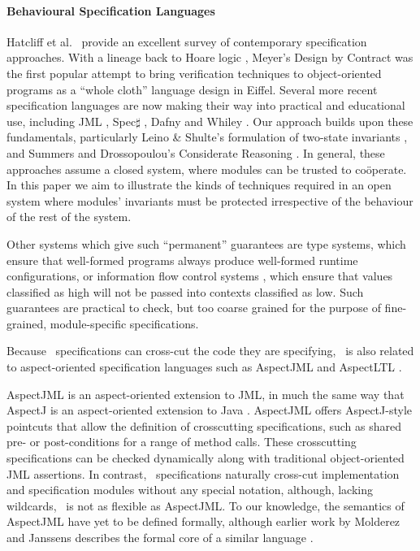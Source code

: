 \paragraph{Behavioural Specification Languages} 

Hatcliff et al.\ \cite{behavSurvey2012} provide an excellent survey of
contemporary specification approaches.  With a lineage back to Hoare
logic \cite{Hoare69}, Meyer's Design by Contract \cite{Mey88} was the
first popular attempt to bring verification techniques to
object-oriented programs as a ``whole cloth'' language design in
Eiffel.  Several more recent specification languages are now making
their way into practical and educational use, including JML
\cite{Leavens-etal07}, Spec$\sharp$ \cite{BarLeiSch05}, Dafny
\cite{dafny} and Whiley \cite{whiley15}. Our approach builds upon
these fundamentals, particularly Leino \& Shulte's
formulation of
two-state invariants \cite{usingHistory}, and Summers and
Drossopoulou's Considerate Reasoning \cite{Considerate}.
%
In general, these approaches assume a closed system, where modules
can be trusted to co{\"o}perate. In this paper we aim to illustrate
the kinds of techniques required in an open system where modules'
invariants must be protected irrespective of the behaviour of the rest
of the system.

 
Other systems which give such ``permanent'' guarantees are  type systems, 
which ensure that well-formed programs  always produce well-formed runtime
configurations, or information flow control systems \cite{infoflow}, which ensure that values 
classified as high  will not be passed into contexts classified as low. 
Such  guarantees %
 are  practical to check, but   too coarse grained
for the purpose of fine-grained,  module-specific specifications. 


Because \Chainmail\ specifications can cross-cut the code they are
specifying, \Chainmail\  is also related to 
aspect-oriented specification
languages such as AspectJML \cite{AspectJML} and AspectLTL
\cite{AspectLTL}.

AspectJML is an aspect-oriented extension to JML,
in much the same way that AspectJ is an aspect-oriented extension to
Java \cite{AspectJ}.  AspectJML offers AspectJ-style pointcuts 
that allow the definition of crosscutting specifications, such as 
shared pre- or post-conditions for a range of method calls. These
crosscutting specifications can be checked dynamically along with
traditional object-oriented JML assertions. In contrast, \Chainmail\
specifications naturally cross-cut implementation and specification
modules without any special notation, although, lacking wildcards,
\Chainmail\ is not as flexible as AspectJML. To our knowledge, the
semantics of AspectJML have yet to be defined formally, although
earlier work by Molderez and Janssens describes the formal core of a
similar language \cite{DbCAspectJ}.


